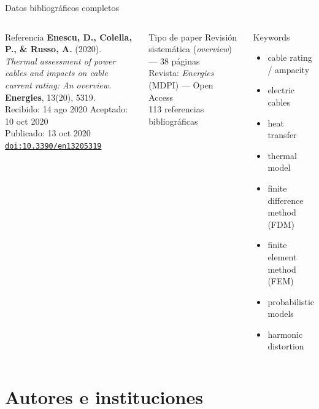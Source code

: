 \documentclass[aspectratio=169]{beamer}
\begin{document}
\begin{frame}{Datos bibliográficos completos}
  \begin{columns}[T]
      \begin{block}{Referencia}
        \small
        \textbf{Enescu, D., Colella, P., \& Russo, A.} (2020).\\
        \textit{Thermal assessment of power cables and impacts on cable
        current rating: An overview.}\\
        \textbf{Energies}, 13(20), 5319.\\[0.3em]
        Recibido: 14 ago 2020 \quad Aceptado: 10 oct 2020\\
        Publicado: 13 oct 2020\\[0.3em]
        \href{https://doi.org/10.3390/en13205319}
             {\texttt{doi:10.3390/en13205319}}
      \end{block}
      \begin{exampleblock}{Tipo de paper}
        \small Revisión sistemática (\textit{overview}) --- 38 páginas\\
        Revista: \textit{Energies} (MDPI) --- Open Access\\
        113 referencias bibliográficas
      \end{exampleblock}
      \begin{block}{Keywords}
        \small
        \begin{itemize}
          \item cable rating / ampacity
          \item electric cables
          \item heat transfer
          \item thermal model
          \item finite difference method (FDM)
          \item finite element method (FEM)
          \item probabilistic models
          \item harmonic distortion
        \end{itemize}
      \end{block}
  \end{columns}
\end{frame}

\section{Autores e instituciones}
\end{document}
